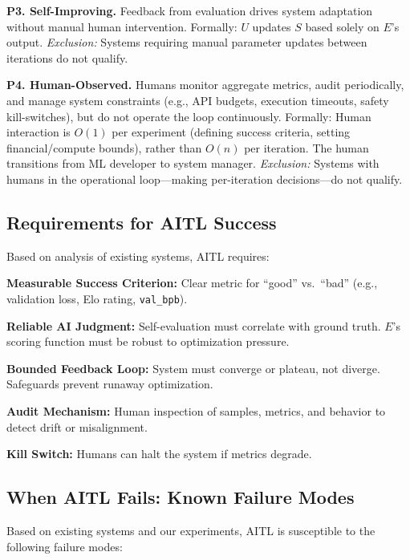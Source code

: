 \documentclass[11pt]{article}
\begin{document}
\textbf{P3. Self-Improving.} Feedback from evaluation drives system adaptation without manual human intervention. Formally: $U$ updates $S$ based solely on $E$'s output. \emph{Exclusion:} Systems requiring manual parameter updates between iterations do not qualify.

\textbf{P4. Human-Observed.} Humans monitor aggregate metrics, audit periodically, and manage system constraints (e.g., API budgets, execution timeouts, safety kill-switches), but do not operate the loop continuously. Formally: Human interaction is $O(1)$ per experiment (defining success criteria, setting financial/compute bounds), rather than $O(n)$ per iteration. The human transitions from ML developer to system manager. \emph{Exclusion:} Systems with humans in the operational loop---making per-iteration decisions---do not qualify.

\subsection{Requirements for AITL Success}

Based on analysis of existing systems, AITL requires:

\begin{description}[nosep,leftmargin=1em,labelwidth=0.5em]
  \item[R1.] \textbf{Measurable Success Criterion:} Clear metric for ``good'' vs.\ ``bad'' (e.g., validation loss, Elo rating, \texttt{val\_bpb}).
  \item[R2.] \textbf{Reliable AI Judgment:} Self-evaluation must correlate with ground truth. $E$'s scoring function must be robust to optimization pressure.
  \item[R3.] \textbf{Bounded Feedback Loop:} System must converge or plateau, not diverge. Safeguards prevent runaway optimization.
  \item[R4.] \textbf{Audit Mechanism:} Human inspection of samples, metrics, and behavior to detect drift or misalignment.
  \item[R5.] \textbf{Kill Switch:} Humans can halt the system if metrics degrade.
\end{description}

\subsection{When AITL Fails: Known Failure Modes}

Based on existing systems and our experiments, AITL is susceptible to the following failure modes:
\end{document}
